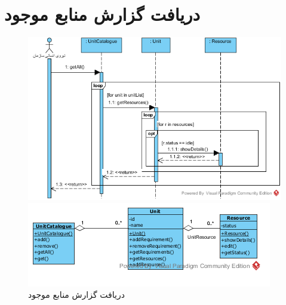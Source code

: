 \section{دریافت گزارش منابع موجود}
\begin{figure}[H]
	\centering
	\includegraphics[scale=0.7]{img/sequence-analysis/AvailableResourcesReport}
	
	
 	\includegraphics[scale=0.8]{img/sequence-analysis/AvailableResourcesReportC}
	\caption{دریافت گزارش منابع موجود}
\end{figure}


